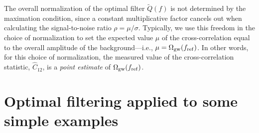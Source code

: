 The overall normalization of the optimal filter $\tilde Q(f)$ 
is not determined by the maximation condition, since
a constant multiplicative factor cancels out when
calculating  the signal-to-noise ratio $\rho=\mu/\sigma$.  
Typically, we use this freedom in the choice of 
normalization to set the expected value $\mu$ of the
cross-correlation equal to the overall amplitude of 
the background---i.e., $\mu = \Omega_{\rm gw}(f_{\rm ref})$.
In other words, for this choice of normalization, 
the measured value of the 
cross-correlation statistic, $\hat C_{12}$, is a 
{\em point estimate} of $\Omega_{\rm gw}(f_{\rm ref})$.

\section{Optimal filtering applied to some simple examples}
\label{s:simple_examples}

